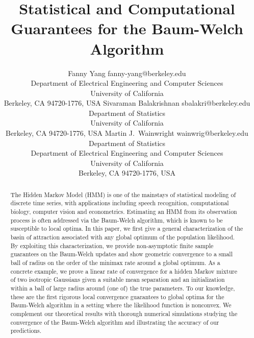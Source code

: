 \documentclass[twoside,11pt]{article}
\begin{document}
\title{Statistical and Computational Guarantees for the Baum-Welch Algorithm}

\author{\name Fanny Yang \email fanny-yang@berkeley.edu \\
       \addr Department of Electrical Engineering and Computer Sciences\\
       University of California\\
       Berkeley, CA 94720-1776, USA
       \AND
       \name Sivaraman Balakrishnan \email sbalakri@berkeley.edu \\
       \addr Department of Statistics\\
       University of California\\
       Berkeley, CA 94720-1776, USA
       \AND
       \name Martin J.\ Wainwright \email wainwrig@berkeley.edu \\
       \addr Department of Statistics\\
       Department of Electrical Engineering and Computer Sciences\\
       University of California\\
       Berkeley, CA 94720-1776, USA}


\maketitle

\begin{abstract}%
The Hidden Markov Model (HMM) is one of the mainstays of statistical
modeling of discrete time series, with applications including speech
recognition, computational biology, computer vision and econometrics.
Estimating an HMM from its observation process is often addressed via
the Baum-Welch algorithm, which is known to be susceptible to local
optima.  In this paper, we first give a general characterization of
the basin of attraction associated with any global optimum of the
population likelihood.  By exploiting this characterization, we
provide non-asymptotic finite sample guarantees on the Baum-Welch
updates and show geometric convergence to a small ball of radius
on the order of the minimax rate around a global optimum.  As a
concrete example, we prove a linear rate of convergence for a hidden
Markov mixture of two isotropic Gaussians given a suitable mean
separation and an initialization within a ball of large radius around
(one of) the true parameters.  To our knowledge, these are the first
rigorous local convergence guarantees to global optima for the Baum-Welch algorithm in
a setting where the likelihood function is nonconvex.  We complement
our theoretical results with thorough numerical simulations studying
the convergence of the Baum-Welch algorithm and illustrating the
accuracy of our predictions.
\end{abstract}
\end{document}
